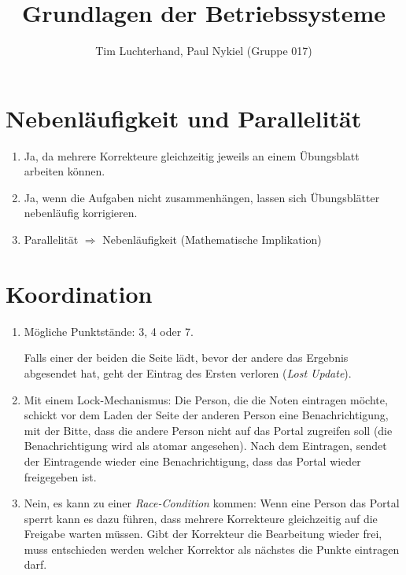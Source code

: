 \documentclass[DIN, pagenumber=false, fontsize=11pt, parskip=half]{scrartcl}
\title{Grundlagen der Betriebssysteme}
\author{Tim Luchterhand, Paul Nykiel (Gruppe 017)}
\begin{document}
    \maketitle
    \section{Nebenläufigkeit und Parallelität}
    \begin{enumerate}[label=(\alph*)]
        \item Ja, da mehrere Korrekteure gleichzeitig jeweils an einem Übungsblatt arbeiten können.
        \item Ja, wenn die Aufgaben nicht zusammenhängen, lassen sich Übungsblätter nebenläufig korrigieren.
        \item Parallelität $\Rightarrow$ Nebenläufigkeit (Mathematische Implikation)
    \end{enumerate}
    \section{Koordination}
    \begin{enumerate}[label=(\alph*)]
        \item Mögliche Punktstände: 3, 4 oder 7. 
            
            Falls einer der beiden die Seite lädt, bevor der andere das Ergebnis abgesendet hat, geht der Eintrag des Ersten verloren (\textit{Lost Update}).
        \item Mit einem Lock-Mechanismus: Die Person, die die Noten eintragen möchte, schickt vor dem Laden der Seite der anderen Person eine Benachrichtigung, mit der Bitte, dass die andere Person nicht auf das Portal zugreifen soll (die Benachrichtigung wird als atomar angesehen). Nach dem Eintragen, sendet der Eintragende wieder eine Benachrichtigung, dass das Portal wieder freigegeben ist.
        \item Nein, es kann zu einer \textit{Race-Condition} kommen: Wenn eine Person das Portal \glqq{}sperrt\grqq{} kann es dazu führen, dass mehrere Korrekteure gleichzeitig auf die Freigabe warten müssen. Gibt der Korrekteur die Bearbeitung wieder frei, muss entschieden werden welcher Korrektor als nächstes die Punkte eintragen darf.
    \end{enumerate}
\end{document}
